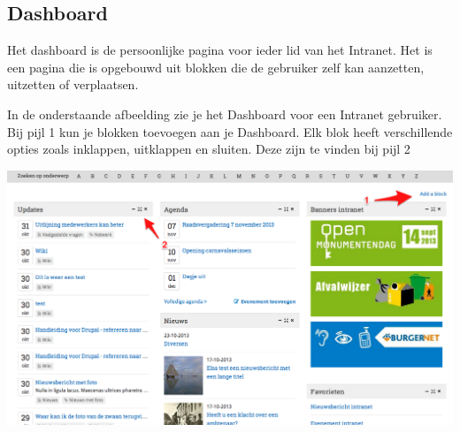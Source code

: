 \subsection{Dashboard}\label{dashboard}
Het dashboard is de persoonlijke pagina voor ieder lid van het Intranet. Het is een pagina die is opgebouwd uit blokken die de gebruiker zelf kan aanzetten, uitzetten of verplaatsen.

In de onderstaande afbeelding zie je het Dashboard voor een Intranet gebruiker. 
Bij pijl 1 kun je blokken toevoegen aan je Dashboard. Elk blok heeft verschillende opties zoals inklappen, uitklappen en sluiten. Deze zijn te vinden bij pijl 2

\begin{center}
	\includegraphics[width=\textwidth]{img/dashboard.png}
\end{center}
